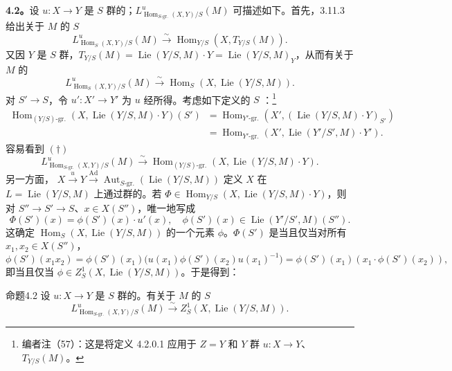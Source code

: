 \textbf{4.2。}设 $u:X\to Y$ 是 $S$ 群的；$L^u_{\operatorname{Hom}_{S\text{-gr.}}(X,Y)/S}(M)$ 可描述如下。首先，3.11.3 给出关于 $M$ 的 $S$ 
\[L^u_{\operatorname{Hom}_S(X,Y)/S}(M)\xrightarrow{\sim}\operatorname{Hom}_{Y/S}(X,T_{Y/S}(M)).\tag{$\dagger$}\]
又因 $Y$ 是 $S$ 群，$T_{Y/S}(M)=\operatorname{Lie}(Y/S,M)\cdot Y=\operatorname{Lie}(Y/S,M)_Y$，从而有关于 $M$ 的
\[L^u_{\operatorname{Hom}_S(X,Y)/S}(M)\xrightarrow{\sim}\operatorname{Hom}_S(X,\operatorname{Lie}(Y/S,M)).\]
对 $S'\to S$，令 $u':X'\to Y'$ 为 $u$ 经所得。考虑如下定义的 $S$ ：\footnote{编者注（57）：这是将定义 4.2.0.1 应用于 $Z=Y$ 和 $Y$ 群 $u:X\to Y$、$T_{Y/S}(M)$。}
\[\begin{aligned}
\operatorname{Hom}_{(Y/S)\text{-gr.}}(X,\operatorname{Lie}(Y/S,M)\cdot Y)(S')
&=\operatorname{Hom}_{Y'\text{-gr.}}(X',(\operatorname{Lie}(Y/S,M)\cdot Y)_{S'})\\
&=\operatorname{Hom}_{Y'\text{-gr.}}(X',\operatorname{Lie}(Y'/S',M)\cdot Y').
\end{aligned}\]
容易看到 $(\dagger)$ 
\[L^u_{\operatorname{Hom}_{S\text{-gr.}}(X,Y)/S}(M)\xrightarrow{\sim}\operatorname{Hom}_{(Y/S)\text{-gr.}}(X,\operatorname{Lie}(Y/S,M)\cdot Y).\tag{$\dagger'$}\]
另一方面， $X\xrightarrow{u}Y\xrightarrow{\operatorname{Ad}}\operatorname{Aut}_{S\text{-gr.}}(\operatorname{Lie}(Y/S,M))$
定义 $X$ 在 $L=\operatorname{Lie}(Y/S,M)$ 上通过群的。若 $\Phi\in\operatorname{Hom}_{Y/S}(X,\operatorname{Lie}(Y/S,M)\cdot Y)$，则对 $S''\to S'\to S$、$x\in X(S'')$，唯一地写成
\[\Phi(S')(x)=\phi(S')(x)\cdot u'(x),\quad\phi(S')(x)\in\operatorname{Lie}(Y'/S',M)(S'').\]
这确定 $\operatorname{Hom}_S(X,\operatorname{Lie}(Y/S,M))$ 的一个元素 $\phi$。$\Phi(S')$ 是当且仅当对所有 $x_1,x_2\in X(S'')$，
\[\phi(S')(x_1x_2)=\phi(S')(x_1)\bigl(u(x_1)\phi(S')(x_2)u(x_1)^{-1}\bigr)=\phi(S')(x_1)(x_1\cdot\phi(S')(x_2)),\]
即当且仅当 $\phi\in Z^1_S(X,\operatorname{Lie}(Y/S,M))$。于是得到：
\begin{SGAresult}{命题}{4.2}
设 $u:X\to Y$ 是 $S$ 群的。有关于 $M$ 的 $S$ 
\[L^u_{\operatorname{Hom}_{S\text{-gr.}}(X,Y)/S}(M)\xrightarrow{\sim}Z^1_S(X,\operatorname{Lie}(Y/S,M)).\]
\end{SGAresult}

